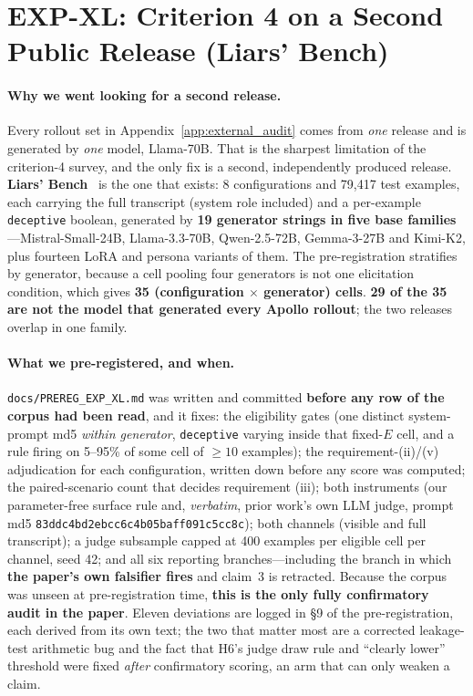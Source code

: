 \section{EXP-XL: Criterion 4 on a Second Public Release (Liars' Bench)}
\label{app:liars_bench}

\paragraph{Why we went looking for a second release.} Every rollout set in Appendix~\ref{app:external_audit} comes from \emph{one} release and is generated by \emph{one} model, Llama-70B. That is the sharpest limitation of the criterion-4 survey, and the only fix is a second, independently produced release. \textbf{Liars' Bench}~\citep{kretschmar2025liarsbench} is the one that exists: 8 configurations and 79{,}417 test examples, each carrying the full transcript (system role included) and a per-example \texttt{deceptive} boolean, generated by \textbf{19 generator strings in five base families}---Mistral-Small-24B, Llama-3.3-70B, Qwen-2.5-72B, Gemma-3-27B and Kimi-K2, plus fourteen LoRA and persona variants of them. The pre-registration stratifies by generator, because a cell pooling four generators is not one elicitation condition, which gives \textbf{35 (configuration $\times$ generator) cells}. \textbf{29 of the 35 are not the model that generated every Apollo rollout}; the two releases overlap in one family.

\paragraph{What we pre-registered, and when.} \texttt{docs/PREREG\_EXP\_XL.md} was written and committed \textbf{before any row of the corpus had been read}, and it fixes: the eligibility gates (one distinct system-prompt md5 \emph{within generator}, \texttt{deceptive} varying inside that fixed-$E$ cell, and a rule firing on 5--95\% of some cell of $\geq\!10$ examples); the requirement-(ii)/(v) adjudication for each configuration, written down before any score was computed; the paired-scenario count that decides requirement (iii); both instruments (our parameter-free surface rule and, \emph{verbatim}, prior work's own LLM judge, prompt md5 \texttt{83ddc4bd2ebcc6c4b05baff091c5cc8c}); both channels (visible and full transcript); a judge subsample capped at 400 examples per eligible cell per channel, seed 42; and all six reporting branches---including the branch in which \textbf{the paper's own falsifier fires} and claim~3 is retracted. Because the corpus was unseen at pre-registration time, \textbf{this is the only fully confirmatory audit in the paper}. Eleven deviations are logged in §9 of the pre-registration, each derived from its own text; the two that matter most are a corrected leakage-test arithmetic bug and the fact that H6's judge draw rule and ``clearly lower'' threshold were fixed \emph{after} confirmatory scoring, an arm that can only weaken a claim.

